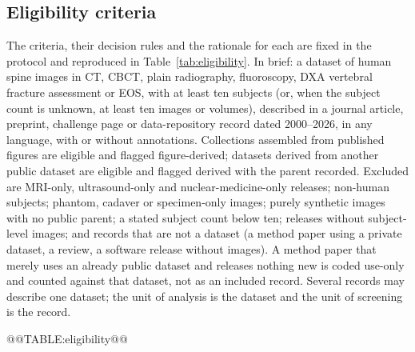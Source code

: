 \documentclass[11pt,a4paper]{article}
\newcommand{\tabref}[1]{Table~\ref{tab:#1}}
\newcommand{\yearRange}{2000--2026}
\begin{document}
\subsection{Eligibility criteria}\label{sec:eligibility}
The criteria, their decision rules and the rationale for each are fixed in the protocol and reproduced in \tabref{eligibility}. In brief: a dataset of human spine images in CT, CBCT, plain radiography, fluoroscopy, DXA vertebral fracture assessment or EOS, with at least ten subjects (or, when the subject count is unknown, at least ten images or volumes), described in a journal article, preprint, challenge page or data-repository record dated \yearRange, in any language, with or without annotations. Collections assembled from published figures are eligible and flagged figure-derived; datasets derived from another public dataset are eligible and flagged derived with the parent recorded. Excluded are MRI-only, ultrasound-only and nuclear-medicine-only releases; non-human subjects; phantom, cadaver or specimen-only images; purely synthetic images with no public parent; a stated subject count below ten; releases without subject-level images; and records that are not a dataset (a method paper using a private dataset, a review, a software release without images). A method paper that merely uses an already public dataset and releases nothing new is coded use-only and counted against that dataset, not as an included record. Several records may describe one dataset; the unit of analysis is the dataset and the unit of screening is the record.

@@TABLE:eligibility@@
\end{document}
